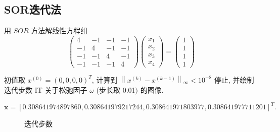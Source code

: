 \subsection{SOR迭代法}
\begin{ex}
	用 $S O R$ 方法解线性方程组
	$$
	\left(\begin{array}{cccc}
		4 & -1 & -1 & -1 \\
		-1 & 4 & -1 & -1 \\
		-1 & -1 & 4 & -1 \\
		-1 & -1 & -1 & 4
	\end{array}\right)\left(\begin{array}{l}
		x_1 \\
		x_2 \\
		x_3 \\
		x_4
	\end{array}\right)=\left(\begin{array}{l}
		1 \\
		1 \\
		1 \\
		1
	\end{array}\right)
	$$
	
	初值取 $x^{(0)}=(0,0,0,0)^T$, 计算到 $\left\|x^{(k)}-x^{(k-1)}\right\|_{\infty}<10^{-8}$ 停止, 并绘制迭代步数 IT 关于松驰因子 $\omega$ (步长取 0.01$)$ 的图像.
\end{ex}

\qa
 $\mathbf{x}=\left[0.308641974897860,0.308641979217244,0.308641971803977,0.308641977711201\right]^T.$
\begin{figure}[H]
	\centering
	\hfill
	\caption{迭代步数}
\end{figure}
